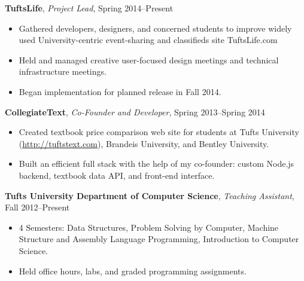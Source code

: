 \documentclass[10pt, letter]{article}
\newenvironment{list1}{
  \begin{list}{\ding{113}}{%
      \setlength{\itemsep}{0in}
      \setlength{\parsep}{0in} \setlength{\parskip}{0in}
      \setlength{\topsep}{0in} \setlength{\partopsep}{0in} 
      \setlength{\leftmargin}{0.17in}}}{\end{list}}
\begin{document}
\vspace{6pt}
{\bf TuftsLife}, \emph{Project Lead}, Spring 2014--Present\\
\vspace*{-.15in}
\begin{itemize}[topsep=0pt, itemsep=-1pt]
\item Gathered developers, designers, and concerned students to improve widely used University-centric event-sharing and classifieds site TuftsLife.com
\item Held and managed creative user-focused design meetings and technical infrastructure meetings.
\item Began implementation for planned release in Fall 2014.
\end{itemize}
\vspace{6pt}
{\bf CollegiateText}, {\em Co-Founder and Developer}, Spring 2013--Spring 2014\\
\vspace*{-.15in}
\begin{itemize}[topsep=0pt,itemsep=-1pt]
            \item Created textbook price comparison web site for students at Tufts University (\url{http://tuftstext.com}), Brandeis University, and Bentley University.
            \item Built an efficient full stack with the help of my co-founder: custom Node.js backend, textbook data API, and front-end interface. 
        \end{itemize}
\vspace{6pt}
{\bf Tufts University Department of Computer Science}, {\em Teaching Assistant}, Fall 2012--Present\\
\vspace*{-.15in}
\begin{itemize}[topsep=0pt,itemsep=-1pt]
  \item 4 Semesters: Data Structures, Problem Solving by Computer, Machine Structure and Assembly Language Programming, Introduction to Computer Science.
  \item Held office hours, labs, and graded programming assignments.
\end{itemize}
\end{document}

